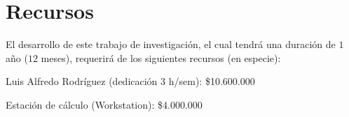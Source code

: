 \newpage
\section{Recursos}
El desarrollo de este trabajo de investigación, el cual tendrá una duración de $1$ año ($12$ meses), requerirá de los siguientes recursos (en especie): 

\vspace{10pt}

Luis Alfredo Rodríguez (dedicación 3 h/sem): \$10.600.000 

\vspace{10pt}

Estación de cálculo (Workstation): \$4.000.000        